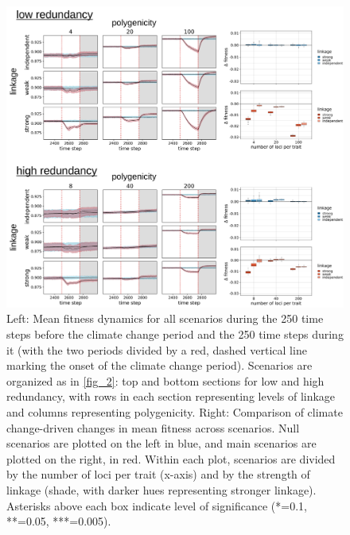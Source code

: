 \documentclass[9pt,twocolumn,twoside,lineno]{pnas-new}
\begin{document}
\begin{figure}[\sidecaptionrelwidth][t]
\centering
\includegraphics[width=17.8cm]{pub/figs/FIG_3_fit_over_time.jpg}
\caption{Left: Mean fitness dynamics for all scenarios during the 250 time steps before the climate change period and the 250 time steps during it (with the two periods divided by a red, dashed vertical line marking the onset of the climate change period). Scenarios are organized as in \ref{fig_2}: top and bottom sections for low and high redundancy, with rows in each section representing levels of linkage and columns representing polygenicity. Right: Comparison of climate change-driven changes in mean fitness across scenarios. Null scenarios are plotted on the left in blue, and main scenarios are plotted on the right, in red. Within each plot, scenarios are divided by the number of loci per trait (x-axis) and by the strength of linkage (shade, with darker hues representing stronger linkage). Asterisks above each box indicate level of significance (*=0.1, **=0.05, ***=0.005).}
\label{fig:fig_3}
\end{figure}
\end{document}

